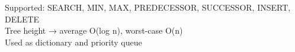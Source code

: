 \documentclass[preview]{standalone}
\begin{document}
Supported: SEARCH, MIN, MAX, PREDECESSOR, SUCCESSOR, INSERT, DELETE\\Tree height → average O(log n), worst-case O(n)\\Used as dictionary and priority queue\\
\end{document}
